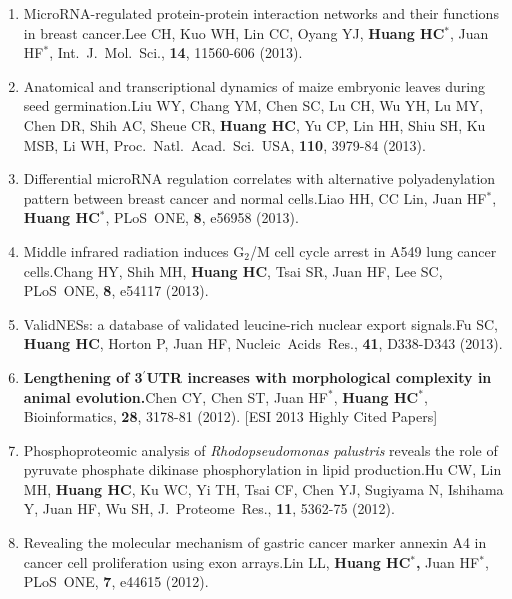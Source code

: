 \documentclass[10pt,a4paper]{article}
\def\mypub#1#2#3{{#1.}\newline #2, #3.}
\def\mybpub#1#2#3{{\boldmath \bf #1.}\newline #2, #3.}
\def\cited#1{Cited $\ge$ #1}
\begin{document}
\begin{enumerate}
\item
\mypub{MicroRNA-regulated protein-protein interaction networks and their
functions in breast cancer}
{Lee CH, Kuo WH, Lin CC, Oyang YJ, {\bf Huang HC$^*$}, Juan HF$^*$}
{Int.\ J.\ Mol.\ Sci., {\bf 14}, 11560-606 (2013)}

\item
\mypub{Anatomical and transcriptional dynamics of maize embryonic leaves during seed germination}
{Liu WY, Chang YM, Chen SC, Lu CH, Wu YH, Lu MY, Chen DR, Shih AC, Sheue CR, {\bf Huang HC}, Yu CP, Lin HH, Shiu SH, Ku MSB, Li WH}
{Proc.\ Natl.\ Acad.\ Sci.\ USA, {\bf 110}, 3979-84 (2013)}

\item
\mypub{Differential microRNA regulation correlates with alternative polyadenylation pattern between breast cancer and normal cells}
{Liao HH, CC Lin, Juan HF$^*$, {\bf Huang HC$^*$}}
{PLoS\ ONE, {\bf 8}, e56958 (2013)}

\item
\mypub{Middle infrared radiation induces G$_2$/M cell cycle arrest in A549 lung cancer cells}
{Chang HY, Shih MH, {\bf Huang HC}, Tsai SR, Juan HF, Lee SC}
{PLoS\ ONE, {\bf 8}, e54117 (2013)}

\item
\mypub{ValidNESs: a database of validated leucine-rich nuclear export signals}
{Fu SC, {\bf Huang HC}, Horton P, Juan HF}
{Nucleic\ Acids\ Res., {\bf 41}, D338-D343 (2013)}

\item
\mybpub{Lengthening of 3$^\prime$UTR increases with morphological complexity in animal evolution}
{Chen CY, Chen ST, Juan HF$^{*}$, {\bf Huang HC$^{*}$}}
{Bioinformatics, {\bf 28}, 3178-81 (2012)} [ESI 2013 {Highly Cited Papers}]

\item
\mypub{Phosphoproteomic analysis of \textsl{Rhodopseudomonas palustris} reveals the role of pyruvate phosphate dikinase phosphorylation in lipid production}
{Hu CW, Lin MH, {\bf Huang HC}, Ku WC, Yi TH, Tsai CF, Chen YJ, Sugiyama N, Ishihama Y, Juan HF, Wu SH}
{J.\ Proteome\ Res., {\bf 11}, 5362-75 (2012)}

\item
\mypub{Revealing the molecular mechanism of gastric cancer marker annexin A4 in cancer cell proliferation using exon arrays}
{Lin LL, {\bf Huang HC$^{*}$,} Juan HF$^{*}$}
{PLoS\ ONE, {\bf 7}, e44615 (2012)}


\end{enumerate}
\end{document}
